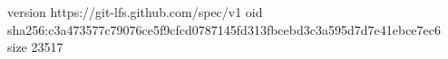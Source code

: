 version https://git-lfs.github.com/spec/v1
oid sha256:c3a473577c79076ce5f9cfcd0787145fd313fbcebd3c3a595d7d7e41ebce7ec6
size 23517
